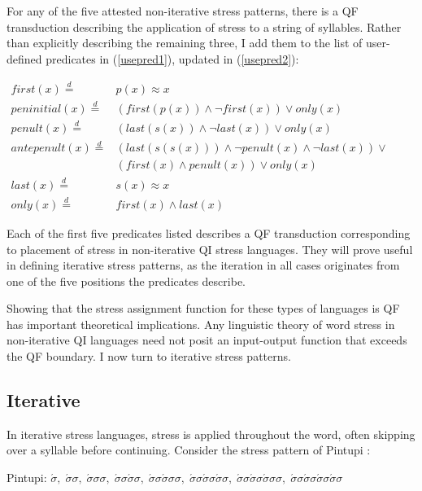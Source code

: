\documentclass[12pt]{article}
\newcommand{\sig}{\sigma}
\newcommand{\deq}{\stackrel{d}{=}}
\newcommand{\ass}{\acute{\sig}}
\newcommand{\tr}{\ass\sig}
\begin{document}
For any of the five attested non-iterative stress patterns, there is a QF transduction describing the application of stress to a string of syllables. Rather than explicitly describing the remaining three, I add them to the list of user-defined predicates in (\ref{usepred1}), updated in (\ref{usepred2}): 


\begin{exe}

\item $\begin{array}{rl}
   first(x) \deq &  p(x) \approx x  \\
   peninitial(x) \deq & (first(p(x)) \land \neg first(x)) \lor only(x) \\
   penult(x) \deq & (last(s(x)) \land \neg last(x)) \lor only(x) \\
   antepenult(x) \deq & (last(s(s(x))) \land \neg penult(x) \land \neg last(x))\lor \\
    &   (first(x) \land penult(x)) \lor only(x)\\
   last(x) \deq & s(x) \approx x \\
   only(x) \deq & first(x) \land last(x)
\end{array} $
\label{usepred2}
\end{exe}

\noindent
Each of the first five predicates listed describes a QF transduction corresponding to placement of stress in non-iterative QI stress languages. They will prove useful in defining iterative stress patterns, as the iteration in all cases originates from one of the five positions the predicates describe.

Showing that the stress assignment function for these types of languages is QF has important theoretical implications. Any linguistic theory of word stress in non-iterative QI languages need not posit an input-output function that exceeds the QF boundary. I now turn to iterative stress patterns. 

\subsection{Iterative}

In iterative stress languages, stress is applied throughout the word, often skipping over a syllable before continuing. Consider the stress pattern of Pintupi \citep{hansen69}:

	\begin{exe}
	\item
  	Pintupi:       
  	$\ass, \; \tr, \; \tr\sig, \; \tr\tr, \; \tr\tr\sig, \; \tr\tr\tr, \; \tr\tr\tr\sig, \; \tr\tr\tr\tr   $
  	\end{exe}
\end{document}
